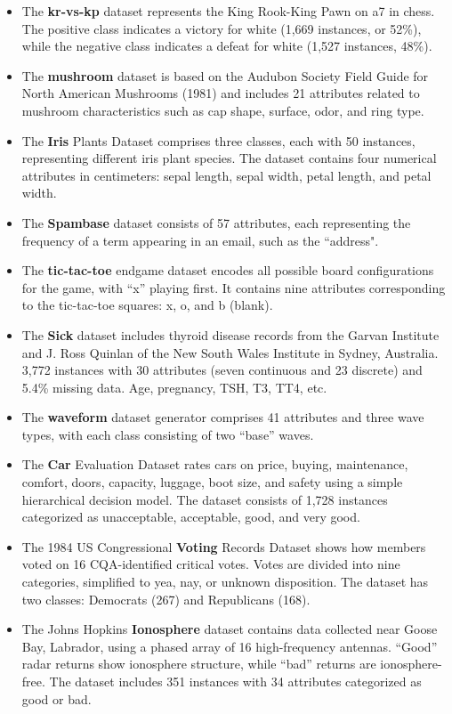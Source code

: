 \documentclass[pdflatex,bst/sn-basic]{bst/sn-jnl}%
\begin{document}
\begin{itemize}
    \item The \textbf{kr-vs-kp} dataset represents the King Rook-King Pawn on a7 in chess. The positive class indicates a victory for white (1,669 instances, or 52\%), while the negative class indicates a defeat for white (1,527 instances, 48\%).

    \item The \textbf{mushroom} dataset is based on the Audubon Society Field Guide for North American Mushrooms (1981) and includes 21 attributes related to mushroom characteristics such as cap shape, surface, odor, and ring type.

    \item The \textbf{Iris} Plants Dataset comprises three classes, each with 50 instances, representing different iris plant species. The dataset contains four numerical attributes in centimeters: sepal length, sepal width, petal length, and petal width.

    \item The \textbf{Spambase} dataset consists of 57 attributes, each representing the frequency of a term appearing in an email, such as the ``address".

    \item The \textbf{tic-tac-toe} endgame dataset encodes all possible board configurations for the game, with ``x'' playing first. It contains nine attributes corresponding to the tic-tac-toe squares: x, o, and b (blank).

    \item The \textbf{Sick} dataset includes thyroid disease records from the Garvan Institute and J. Ross Quinlan of the New South Wales Institute in Sydney, Australia. 3,772 instances with 30 attributes (seven continuous and 23 discrete) and 5.4\% missing data. Age, pregnancy, TSH, T3, TT4, etc.

    \item The \textbf{waveform} dataset generator comprises 41 attributes and three wave types, with each class consisting of two ``base'' waves.

    \item The \textbf{Car} Evaluation Dataset rates cars on price, buying, maintenance, comfort, doors, capacity, luggage, boot size, and safety using a simple hierarchical decision model. The dataset consists of 1,728 instances categorized as unacceptable, acceptable, good, and very good.

    \item The 1984 US Congressional \textbf{Voting} Records Dataset shows how members voted on 16 CQA-identified critical votes. Votes are divided into nine categories, simplified to yea, nay, or unknown disposition. The dataset has two classes: Democrats (267) and Republicans (168).

    \item The Johns Hopkins \textbf{Ionosphere} dataset contains data collected near Goose Bay, Labrador, using a phased array of 16 high-frequency antennas. ``Good'' radar returns show ionosphere structure, while ``bad'' returns are ionosphere-free. The dataset includes 351 instances with 34 attributes categorized as good or bad.
\end{itemize}
\end{document}
